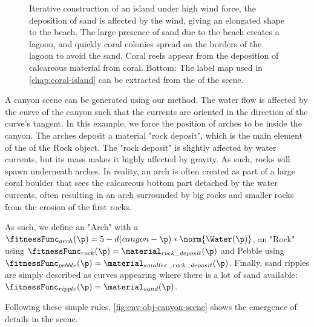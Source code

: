 \begin{figure}
    \caption{Iterative construction of an island under high wind force, the deposition of sand is affected by the wind, giving an elongated shape to the beach. The large presence of sand due to the beach creates a lagoon, and quickly coral colonies spread on the borders of the lagoon to avoid the sand. Coral reefs appear from the deposition of calcareous material from coral. Bottom: The label map used in \cref{chap:coral-island} can be extracted from the  of the scene.}
    \label{fig:env-obj-iterative-island}
\end{figure}

A canyon scene can be generated using our method. The water flow is affected by the curve of the canyon such that the currents are oriented in the direction of the curve's tangent. In this example, we force the position of arches to be inside the canyon. The arches deposit a material "rock deposit", which is the main element of the  of the Rock object. The "rock deposit" is slightly affected by water currents, but its mass makes it highly affected by gravity. As such, rocks will spawn underneath arches. In reality, an arch is often created as part of a large coral boulder that sees the calcareous bottom part detached by the water currents, often resulting in an arch surrounded by big rocks and smaller rocks from the erosion of the first rocks.

As such, we define an  "Arch" with a  $\fitnessFunc_{arch}(\p) = 5 - d(canyon - \p) * \norm{\Water(\p)}$, an  "Rock" using $\fitnessFunc_{rock}(\p) = \material_{rock\_deposit}(\p)$ and Pebble using $\fitnessFunc_{pebble}(\p) = \material_{smaller\_rock\_deposit}(\p)$. Finally, sand ripples are simply described as curves appearing where there is a lot of sand available: $\fitnessFunc_{ripple}(\p) = \material_{sand}(\p)$.

Following these simple rules, \cref{fig:env-obj-canyon-scene} shows the emergence of details in the scene.

